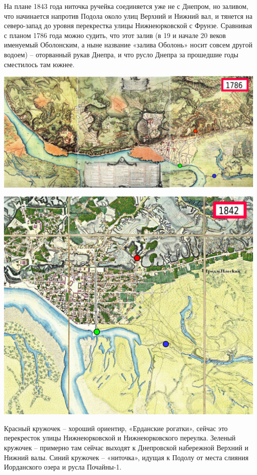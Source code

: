 На плане 1843 года ниточка ручейка соединяется уже не с Днепром, но заливом, что начинается напротив Подола около улиц Верхний и Нижний вал, и тянется на северо-запад до уровня перекрестка улицы Нижнеюрковской с Фрунзе. Сравнивая с планом 1786 года можно судить, что этот залив (в 19 и начале 20 веков именуемый Оболонским, а ныне название «залива Оболонь» носит совсем другой водоем) – оторванный рукав Днепра, и что русло Днепра за прошедшие годы сместилось там южнее.

\newpage

\begin{center}
\includegraphics[width=0.92\linewidth]{chast-colebanie-osnov/pochayna/1786-po.jpg}
\end{center}

\begin{center}
\includegraphics[width=0.92\linewidth]{chast-colebanie-osnov/pochayna/1842-small.jpg}
\end{center}

Красный кружочек – хороший ориентир, «Ерданские рогатки», сейчас это перекресток улицы Нижнеюрковской и Нижнеюрковского переулка. Зеленый кружочек – примерно там сейчас выходят к Днепровской набережной Верхний и Нижний валы. Синий кружочек – «ниточка», идущая к Подолу от места слияния Иорданского озера и русла Почайны-1.
 
